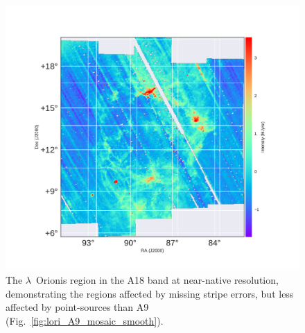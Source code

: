             \begin{figure}
              \includegraphics[width=\textwidth,trim={2.5cm 2cm 3.0cm 2cm},clip]{../Plots/ch_lori/lori_A18_mosaic_smooth.pdf}
              \centering
              \caption{The $\lambda$~Orionis region in the A18 band at near-native resolution, demonstrating the regions affected by missing stripe errors, but less affected by point-sources than A9 (Fig.~\ref{fig:lori_A9_mosaic_smooth}). }
              \label{fig:lori_A18_mosaic_smooth}
            \end{figure}

